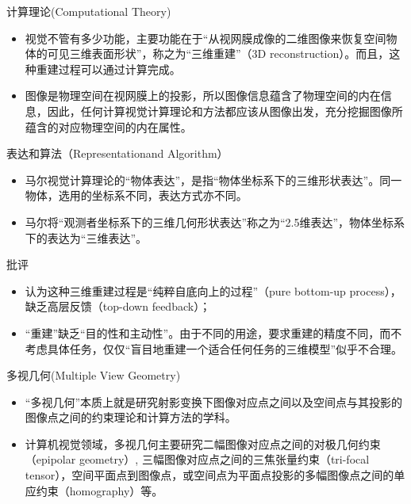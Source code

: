 \documentclass[presentation]{beamer}
\begin{document}
\begin{frame}[label={sec:org391e914}]{计算理论(Computational Theory)}
\begin{itemize}
\item 视觉不管有多少功能，主要功能在于“从视网膜成像的二维图像来恢复空间物体的可见三维表面形状”，称之为“三维重建”（3D reconstruction）。而且，这种重建过程可以通过计算完成。
\item 图像是物理空间在视网膜上的投影，所以图像信息蕴含了物理空间的内在信息，因此，任何计算视觉计算理论和方法都应该从图像出发，充分挖掘图像所蕴含的对应物理空间的内在属性。
\end{itemize}
\end{frame}

\begin{frame}[label={sec:orge4055c3}]{表达和算法（Representationand Algorithm）}
\begin{itemize}
\item 马尔视觉计算理论的“物体表达”，是指“物体坐标系下的三维形状表达”。同一物体，选用的坐标系不同，表达方式亦不同。
\item 马尔将“观测者坐标系下的三维几何形状表达”称之为“2.5维表达”，物体坐标系下的表达为“三维表达”。
\end{itemize}
\end{frame}

\begin{frame}[label={sec:org6d8aab1}]{批评}
\begin{itemize}
\item 认为这种三维重建过程是“纯粹自底向上的过程”（pure bottom-up process），缺乏高层反馈（top-down feedback）；
\item “重建”缺乏“目的性和主动性”。由于不同的用途，要求重建的精度不同，而不考虑具体任务，仅仅“盲目地重建一个适合任何任务的三维模型”似乎不合理。
\end{itemize}
\end{frame}

\begin{frame}[label={sec:orgcf87d52}]{多视几何(Multiple View Geometry)}
\begin{itemize}
\item “多视几何”本质上就是研究射影变换下图像对应点之间以及空间点与其投影的图像点之间的约束理论和计算方法的学科。
\item 计算机视觉领域，多视几何主要研究二幅图像对应点之间的对极几何约束（epipolar geometry）, 三幅图像对应点之间的三焦张量约束（tri-focal tensor），空间平面点到图像点，或空间点为平面点投影的多幅图像点之间的单应约束（homography）等。
\end{itemize}
\end{frame}
\end{document}
